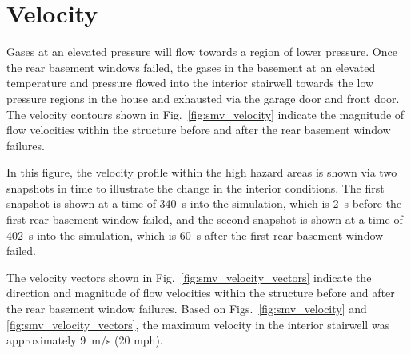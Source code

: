 \documentclass[12pt,oneside]{book}
\begin{document}
\clearpage


\section{Velocity}
\label{sec:velocity}

Gases at an elevated pressure will flow towards a region of lower pressure. Once the rear basement windows failed, the gases in the basement at an elevated temperature and pressure flowed into the interior stairwell towards the low pressure regions in the house and exhausted via the garage door and front door. The velocity contours shown in Fig.~\ref{fig:smv_velocity} indicate the magnitude of flow velocities within the structure before and after the rear basement window failures.

In this figure, the velocity profile within the high hazard areas is shown via two snapshots in time to illustrate the change in the interior conditions. The first snapshot is shown at a time of 340~s into the simulation, which is 2~s before the first rear basement window failed, and the second snapshot is shown at a time of 402~s into the simulation, which is 60~s after the first rear basement window failed.

The velocity vectors shown in Fig.~\ref{fig:smv_velocity_vectors} indicate the direction and magnitude of flow velocities within the structure before and after the rear basement window failures. Based on Figs.~\ref{fig:smv_velocity} and \ref{fig:smv_velocity_vectors}, the maximum velocity in the interior stairwell was approximately 9~m/s (20 mph).
\end{document}
